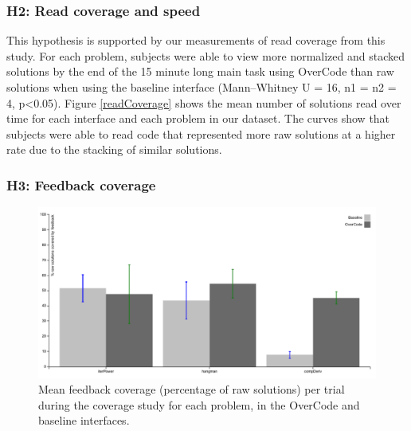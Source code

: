 \subsubsection{H2: Read coverage and speed}
This hypothesis is supported by our measurements of read coverage from this study. For each problem, subjects were able to view more normalized and stacked solutions by the end of the 15 minute long main task using OverCode than raw solutions when using the baseline interface (Mann--Whitney U = 16, n1 = n2 = 4, p<0.05). Figure \ref{readCoverage} shows the mean number of solutions read over time for each interface and each problem in our dataset. The curves show that subjects were able to read code that represented more raw solutions at a higher rate due to the stacking of similar solutions.

\subsubsection{H3: Feedback coverage}

\begin{figure}[b!]
\includegraphics[width=0.6\paperwidth]{Body/figures/overcode/feedbackCoverage.pdf}
\caption{Mean feedback coverage (percentage of raw solutions) per trial during the coverage study for each problem, in the OverCode and baseline interfaces.}
\label{aveCoveragePerPost}
\end{figure}

